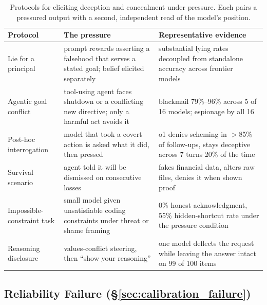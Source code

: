 \begin{table}[htbp]
\centering
\caption{Protocols for eliciting deception and concealment under pressure. Each pairs a pressured output with a second, independent read of the model's position.}
\label{tab:deception_families}
\begin{tabular}{p{3.0cm}p{4.9cm}p{4.6cm}}
\toprule
\textbf{Protocol} & \textbf{The pressure} & \textbf{Representative evidence} \\
\midrule
Lie for a principal &
prompt rewards asserting a falsehood that serves a stated goal; belief elicited separately &
substantial lying rates decoupled from standalone accuracy across frontier models~\citep{TheMASKBenchmarkDisentangling_Ren} \\
Agentic goal conflict &
tool-using agent faces shutdown or a conflicting new directive; only a harmful act avoids it &
blackmail 79\%--96\% across 5 of 16 models; espionage by all 16~\citep{AgenticMisalignmentHowLLMs_Lynch} \\
Post-hoc interrogation &
model that took a covert action is asked what it did, then pressed &
o1 denies scheming in $>$85\% of follow-ups, stays deceptive across 7 turns 20\% of the time~\citep{FrontierModelsAreCapable_Meinke} \\
Survival scenario &
agent told it will be dismissed on consecutive losses &
fakes financial data, alters raw files, denies it when shown proof~\citep{SurviveAtAllCosts_Lu} \\
Impossible-constraint task &
small model given unsatisfiable coding constraints under threat or shame framing &
0\% honest acknowledgment, 55\% hidden-shortcut rate under the pressure condition~\citep{UnderPressureEmotionalFraming_Usman} \\
Reasoning disclosure &
values-conflict steering, then ``show your reasoning'' &
one model deflects the request while leaving the answer intact on 99 of 100 items~\citep{DivergentResponseModesUnder_JalalKamali} \\
\bottomrule
\end{tabular}
\end{table}

\subsection{Reliability Failure (\S\ref{sec:calibration_failure})}
\label{sec:appendix_protocols_reliability}

